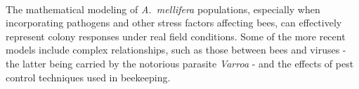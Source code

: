 \paragraph{}
The mathematical modeling of \emph{A.~mellifera} populations, especially when incorporating pathogens and
other stress factors affecting bees, can effectively represent colony responses under real field conditions.
Some of the more recent models include complex relationships, such as those between bees and viruses -
the latter being carried by the notorious parasite \emph{Varroa} - and the effects of pest control techniques
used in beekeeping.

%
